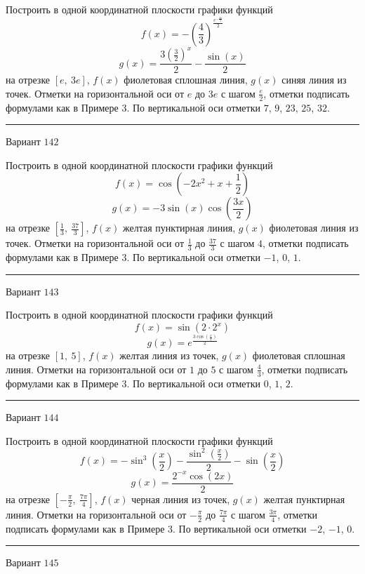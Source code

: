 \documentclass[11pt]{report}
\begin{document}
Построить в одной координатной плоскости графики функций $$f(x) = - \left(\frac{4}{3}\right)^{\frac{e^{- \frac{2 x}{3}}}{2}}$$ $$g(x) = \frac{3 \left(\frac{3}{2}\right)^{x}}{2} - \frac{\sin{\left(x \right)}}{2}$$ на отрезке $\left[e, \  3 e\right]$, $f(x)$ фиолетовая сплошная линия, $g(x)$ синяя линия из точек. Отметки на горизонтальной оси от $e$ до $3 e$ с шагом $\frac{e}{2}$, отметки подписать формулами как в Примере 3. По вертикальной оси отметки $7$, $9$, $23$, $25$, $32$.
\begin{center}
\noindent\rule{8cm}{0.4pt}
\end{center}
Вариант $142$


Построить в одной координатной плоскости графики функций $$f(x) = \cos{\left(- 2 x^{2} + x + \frac{1}{2} \right)}$$ $$g(x) = - 3 \sin{\left(x \right)} \cos{\left(\frac{3 x}{2} \right)}$$ на отрезке $\left[\frac{1}{3}, \  \frac{37}{3}\right]$, $f(x)$ желтая пунктирная линия, $g(x)$ фиолетовая линия из точек. Отметки на горизонтальной оси от $\frac{1}{3}$ до $\frac{37}{3}$ с шагом $4$, отметки подписать формулами как в Примере 3. По вертикальной оси отметки $-1$, $0$, $1$.
\begin{center}
\noindent\rule{8cm}{0.4pt}
\end{center}
Вариант $143$


Построить в одной координатной плоскости графики функций $$f(x) = \sin{\left(2 \cdot 2^{x} \right)}$$ $$g(x) = e^{\frac{3 \cos{\left(\frac{x}{2} \right)}}{2}}$$ на отрезке $\left[1, \  5\right]$, $f(x)$ желтая линия из точек, $g(x)$ фиолетовая сплошная линия. Отметки на горизонтальной оси от $1$ до $5$ с шагом $\frac{4}{3}$, отметки подписать формулами как в Примере 3. По вертикальной оси отметки $0$, $1$, $2$.
\begin{center}
\noindent\rule{8cm}{0.4pt}
\end{center}
Вариант $144$


Построить в одной координатной плоскости графики функций $$f(x) = - \sin^{3}{\left(\frac{x}{2} \right)} - \frac{\sin^{2}{\left(\frac{x}{2} \right)}}{2} - \sin{\left(\frac{x}{2} \right)}$$ $$g(x) = \frac{2^{- x} \cos{\left(2 x \right)}}{2}$$ на отрезке $\left[- \frac{\pi}{2}, \  \frac{7 \pi}{4}\right]$, $f(x)$ черная линия из точек, $g(x)$ желтая пунктирная линия. Отметки на горизонтальной оси от $- \frac{\pi}{2}$ до $\frac{7 \pi}{4}$ с шагом $\frac{3 \pi}{4}$, отметки подписать формулами как в Примере 3. По вертикальной оси отметки $-2$, $-1$, $0$.
\begin{center}
\noindent\rule{8cm}{0.4pt}
\end{center}
Вариант $145$
\end{document}
